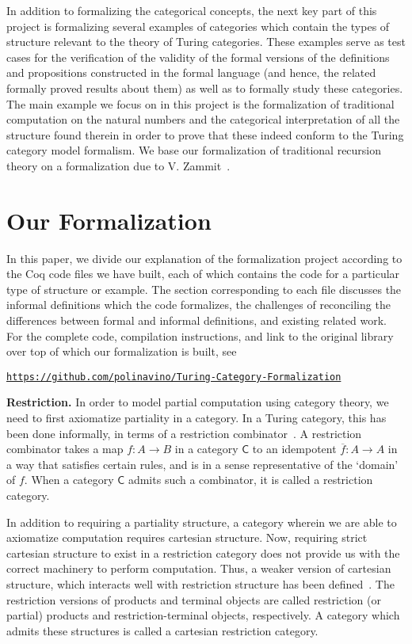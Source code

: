 \documentclass{entcs} \usepackage{entcsmacro}
\begin{document}
In addition to formalizing the categorical concepts, the next key part of this project is formalizing several examples of categories which contain the types of structure relevant to the theory of Turing categories. These examples serve as test cases for the verification of the validity of the formal versions of the definitions and propositions constructed in the formal language (and hence, the related formally proved results about them) as well as to formally study these categories. The main example we focus on in this project is the formalization of traditional computation on the natural numbers and the categorical interpretation of all the structure found therein in order to prove that these indeed conform to the Turing category model formalism. We base our formalization of traditional recursion theory on a formalization due to V. Zammit~\cite{SmnForm}. 

\section{Our Formalization}

In this paper, we divide our explanation of the formalization project according to the Coq code files we have built, each of which contains the code for a particular type of structure or example. The section corresponding to each file discusses the informal definitions which the code formalizes, the challenges of reconciling the differences between formal and informal definitions, and existing related work. For the complete code, compilation instructions, and link to the original library over top of which our formalization is built, see

\href{https://github.com/polinavino/Turing-Category-Formalization}
{\texttt{https://github.com/polinavino/Turing-Category-Formalization}}


{\bfseries Restriction.} In order to model partial computation using category theory, we need to first axiomatize partiality in a category. In a Turing category, this has been done informally, in terms of a restriction combinator~\cite{Restriction}. A restriction combinator takes a map $f : A \to B$ in a category $\mathsf{C}$ to an idempotent $\overline{f} : A \to A$ in a way that satisfies certain rules, and is in a sense representative of the `domain' of $f$. When a category $\mathsf{C}$ admits such a combinator, it is called a restriction category. 

In addition to requiring a partiality structure, a category wherein we are able to axiomatize computation requires cartesian structure. Now, requiring strict cartesian structure to exist in a restriction category does not provide us with the correct machinery to perform computation. Thus, a weaker version of cartesian structure, which interacts well with restriction structure has been defined~\cite{Turing}. The restriction versions of products and terminal objects are called restriction (or partial) products and restriction-terminal objects, respectively. A category which admits these structures is called a cartesian restriction category. 
\end{document}
